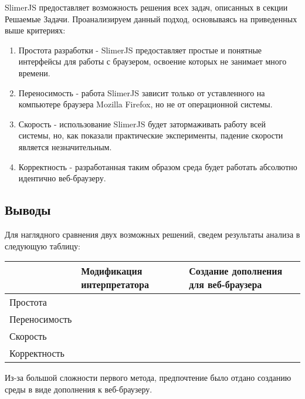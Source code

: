 	SlimerJS предоставляет возможность решения всех задач, описанных в секции Решаемые Задачи. Проанализируем данный подход, основываясь на приведенных выше критериях:

	\begin{enumerate}
		\item Простота разработки - SlimerJS предоставляет простые и понятные интерфейсы для работы с браузером, освоение которых не занимает много времени.
		\item Переносимость - работа SlimerJS зависит только от уставленного на компьютере браузера Mozilla Firefox, но не от операционной системы.
		\item Скорость - использование SlimerJS будет затормаживать работу всей системы, но, как показали практические эксперименты, падение скорости является незначительным.
		\item Корректность - разработанная таким образом среда будет работать абсолютно идентично веб-браузеру.
	\end{enumerate}

\subsection{Выводы}
	Для наглядного сравнения двух возможных решений, сведем результаты анализа в следующую таблицу:

	\begin{table}[h]
		\centering
		\label{my-label}
	\begin{tabular}{|l|l|l|}
	\hline
	              & Модификация интерпретатора                      & Создание дополнения для веб-браузера \\ \hline
	Простота      & \cellcolor[HTML]{CB0000}                        & \cellcolor[HTML]{32CB00}             \\ \hline
	Переносимость & \cellcolor[HTML]{CB0000}                        & \cellcolor[HTML]{32CB00}             \\ \hline
	Скорость      & \cellcolor[HTML]{32CB00} 						& \cellcolor[HTML]{FFC702}             \\ \hline
	Корректность  & \cellcolor[HTML]{32CB00}                        & \cellcolor[HTML]{32CB00}             \\ \hline
	\end{tabular}
	\end{table}


	Из-за большой сложности первого метода, предпочтение было отдано созданию среды в виде дополнения к веб-браузеру.



